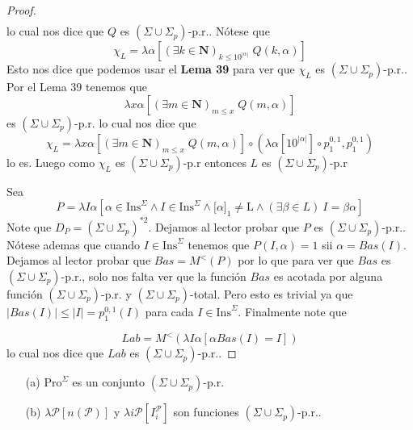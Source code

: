 \begin{lemma}
\begin{proof}
\[\begin{array}{lll}
      \end{array}
    \]
    lo cual nos dice que \(Q\) es \((\Sigma \cup \Sigma _{p})\)-p.r..
    Nótese que
    \[
      \displaystyle \chi_{L}=\lambda \alpha \left[ (\exists k\in \mathbf{N})_{k\leq 10^{\left\vert \alpha
      \right\vert }}\;Q(k,\alpha )\right]
    \]
    Esto nos dice que podemos usar el \textbf{Lema 39} para ver que \(\chi_L\) es \((\Sigma \cup \Sigma _{p})\)-p.r..
    Por el Lema 39 tenemos que
    \[
      \displaystyle \lambda x\alpha \left[ (\exists m\in \mathbf{N})_{m\leq x}\;Q(m,\alpha ) \right]
    \]
    es \((\Sigma \cup \Sigma _{p})\)-p.r. lo cual nos dice que
    \[
      \displaystyle \chi_L=\lambda x\alpha \left[ (\exists m\in \mathbf{N})_{m\leq x}\;Q(m,\alpha ) \right] \circ
      (\lambda \alpha \left[ 10^{\left\vert \alpha \right\vert } \right] \circ p_{1}^{0,1},p_{1}^{0,1})
    \]
    lo es. Luego como $ \chi_L $ es \((\Sigma \cup \Sigma _{p})\)-p.r entonces $L$ es \((\Sigma \cup \Sigma _{p})\)-p.r
    
    \noindent Sea
    \[
      \displaystyle P=\lambda I\alpha \left[ \alpha \in \mathrm{Ins}^{\Sigma }\wedge I\in \mathrm{Ins}^{\Sigma }\wedge
      \lbrack \alpha ]_{1}\neq \mathrm{L}\wedge (\exists \beta \in L)\ I=\beta \alpha \right]
    \]
    Note que \(D_{P}=(\Sigma \cup \Sigma _{p})^{\ast 2}\).
    Dejamos al lector probar que \(P\) es \((\Sigma \cup \Sigma _{p})\)-p.r.. %
    Nótese ademas que cuando \(I\in \mathrm{Ins}^{\Sigma }\) tenemos que
    \(P(I,\alpha )=1\) sii \(\alpha =Bas(I)\).
    Dejamos al lector probar que \(Bas=M^{< }\left( P\right) \) %
    por lo que para ver que \(Bas\) es \((\Sigma \cup \Sigma _{p})\)-p.r., solo nos falta ver que la función \(Bas\)
    es acotada por alguna función \((\Sigma \cup \Sigma _{p})\)-p.r. y \((\Sigma \cup \Sigma _{p})\)-total.
    Pero esto es trivial ya que \(\left\vert Bas(I)\right\vert \leq \left\vert I\right\vert =p_{1}^{0,1}(I)\)
    para cada \(I\in \mathrm{Ins}^{\Sigma }\).
    Finalmente note que

    \[
      \displaystyle Lab=M^{< }\left( \lambda I\alpha \left[ \alpha Bas(I)=I\right] \right)
    \]
    lo cual nos dice que \(Lab\) es \((\Sigma \cup \Sigma _{p})\)-p.r..
  \end{proof}
  \end{lemma}


  \begin{lemma}
    \par
    \begin{itemize}
      \item[(a)]  \(\mathrm{Pro}^{\Sigma }\) es un conjunto \((\Sigma \cup \Sigma _{p}) \)-p.r.
      \item[(b)]  \(\lambda \mathcal{P}\left[ n(\mathcal{P})\right] \) y \(\lambda i \mathcal{P}\left[ I_{i}
                  ^{\mathcal{P}}\right] \) son funciones \((\Sigma \cup \Sigma _{p})\)-p.r..
    \end{itemize}
  \end{lemma}

